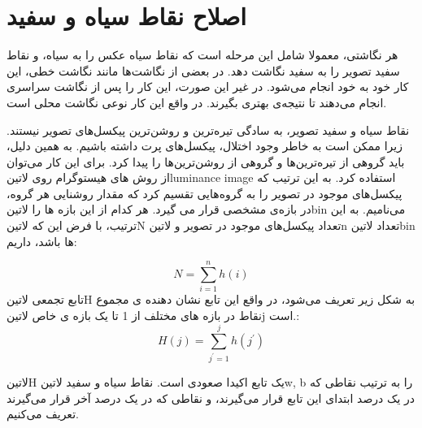\section{اصلاح نقاط سیاه و سفید}
هر نگاشتی، معمولا شامل این مرحله است که نقاط سیاه عکس را به سیاه، و نقاط سفید تصویر را به سفید نگاشت دهد. در بعضی از نگاشت‌ها مانند نگاشت خطی، این کار خود به خود انجام می‌شود. در غیر این صورت، این کار را پس از نگاشت سراسری انجام می‌دهند تا نتیجه‌ی بهتری بگیرند. در واقع این کار نوعی نگاشت محلی است.

نقاط سیاه و سفید تصویر، به سادگی تیره‌ترین و روشن‌ترین پیکسل‌های تصویر نیستند. زیرا ممکن است به خاطر وجود اختلال، پیکسل‌های پرت داشته باشیم. به همین دلیل، باید گروهی از تیره‌ترین‌ها و گروهی از روشن‌ترین‌ها را پیدا کرد. 
برای این کار می‌توان از روش های هیستوگرام روی 
‌لاتین{luminance image  }
استفاده کرد. به این ترتیب که پیکسل‌های موجود در تصویر را به گروه‌هایی تقسیم کرد که مقدار روشنایی هر گروه، در بازه‌ی مشخصی قرار می گیرد. هر کدام از این بازه ها را 
 ‌لاتین{bin  }
 می‌نامیم. 
به این ترتیب، با فرض این که 
 ‌لاتین{N}
 تعداد پیکسل‌های موجود در تصویر و 
  ‌لاتین{n  }
  تعداد 
  ‌لاتین{bin  }
  ها باشد، داریم:

\begin{equation}
N = \sum_{i = 1}^{n} h(i)
\end{equation}
تابع تجمعی 
 ‌لاتین{H  }
به شکل زیر تعریف می‌شود، در واقع این تابع نشان دهنده ی مجموع نقاط در بازه های مختلف از 1 تا یک بازه ی خاص 
‌لاتین{j  }
است.:
\begin{equation}
H(j) = \sum_{j^{'} = 1}^{j} h(j^{'})
\end{equation}

‌لاتین{H  }
 یک تابع اکیدا صعودی است. نقاط  سیاه  و سفید 
 ‌لاتین{w, b  }
 را به ترتیب نقاطی که در یک درصد ابتدای این تابع قرار می‌گیرند، و نقاطی که در یک درصد آخر قرار می‌گیرند تعریف می‌کنیم.

